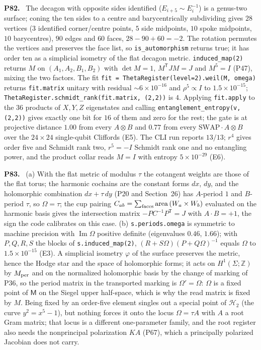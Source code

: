 \documentclass[11pt]{article}
\newcommand{\Z}{\mathbb{Z}}
\newenvironment{solution}[1]{\medskip\noindent\textbf{P#1.}\ }{\par\medskip}
\begin{document}
\begin{solution}{82}
The decagon with opposite sides identified ($E_{i+5}\sim E_i^{-1}$) is a
genus-two surface; coning the ten sides to a centre and barycentrically
subdividing gives $28$ vertices ($3$ identified corner/centre points, $5$ side
midpoints, $10$ spoke midpoints, $10$ barycentres), $90$ edges and $60$
faces, $28-90+60 = -2$. The rotation permutes the vertices and preserves the
face list, so \texttt{is\_automorphism} returns true; it has order ten as a
simplicial isometry of the flat decagon metric. \texttt{induced\_map(2)}
returns $M$ on $(A_1,A_2,B_1,B_2)$ with $\det M = 1$, $M^{\mathsf T}JM = J$ and
$M^5 = I$ (P47), mixing the two factors. The fit
\texttt{fit = ThetaRegister(level=2).weil(M, omega)} returns
\texttt{fit.matrix} unitary with residual $\sim6\times10^{-16}$ and
$\rho^5\propto I$ to $1.5\times10^{-15}$;
\texttt{ThetaRegister.schmidt\_rank(fit.matrix, (2,2))} is $4$. Applying
\texttt{fit.apply} to the $36$ products of $X,Y,Z$ eigenstates and calling
\texttt{entanglement\_entropy(v, (2,2))} gives exactly one bit for $16$ of
them and zero for the rest; the gate is at projective distance $1.00$ from
every $A\otimes B$ and $0.77$ from every $\mathrm{SWAP}\cdot A\otimes B$ over
the $24\times24$ single-qubit Cliffords (E5). The CLI run reports $13/13$;
$r^4$ gives order five and Schmidt rank two, $r^5 = -I$ Schmidt rank one and
no entangling power, and the product collar reads $M = I$ with entropy
$5\times10^{-29}$ (E6).
\end{solution}

\begin{solution}{83}
(a) With the flat metric of modulus $\tau$ the cotangent weights are those of
the flat torus; the harmonic cochains are the constant forms $dx$, $dy$, and
the holomorphic combination $dx+\tau\,dy$ (P20 and Section~26) has
$A$-period $1$ and $B$-period $\tau$, so $\Omega = \tau$; the cup pairing
$C_{ab} = \sum_{\rm faces}\operatorname{area}\,(W_a\times W_b)$ evaluated on the
harmonic basis gives the intersection matrix $-PC^{-1}P^{\mathsf T} = J$ with
$A\cdot B = +1$, the sign the code calibrates on this case. (b)
\texttt{s.periods.omega} is symmetric to machine precision with
$\operatorname{Im}\Omega$ positive definite (eigenvalues $0.46$, $1.66$); with
$P,Q,R,S$ the blocks of \texttt{s.induced\_map(2)}, $(R+S\Omega)(P+Q\Omega)^{-1}$
equals $\Omega$ to $1.5\times10^{-15}$ (E3). A simplicial isometry
$\varphi$ of the surface preserves the metric, hence the Hodge star and the
space of holomorphic forms; it acts on $H^1(\Sigma;\Z)$ by $M_{\rm per}$ and
on the normalized holomorphic basis by the change of marking of P36,
so the period matrix in the transported marking is $\Omega' = \Omega$: $\Omega$
is a fixed point of $\mathsf M$ on the Siegel upper half-space, which is why
the read matrix is fixed by $M$. Being fixed by an order-five element
singles out a special point of $\mathcal H_2$ (the curve $y^2 = x^5-1$), but
nothing forces it onto the locus $\Omega = \tau A$ with $A$ a root Gram
matrix; that locus is a different one-parameter family, and the root register
also needs the nonprincipal polarization $KA$ (P67), which a
principally polarized Jacobian does not carry.
\end{solution}
\end{document}
